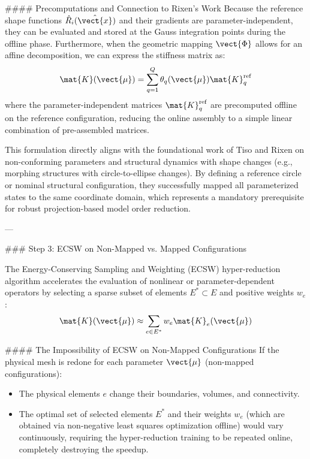 #### Precomputations and Connection to Rixen's Work
Because the reference shape functions $\hat{R}_i(\hat{\vect{x}})$ and their gradients are parameter-independent, they can be evaluated and stored at the Gauss integration points during the offline phase. Furthermore, when the geometric mapping $\vect{\Phi}$ allows for an affine decomposition, we can express the stiffness matrix as:
\begin{equation}
\mat{K}(\vect{\mu}) = \sum_{q=1}^Q \theta_q(\vect{\mu}) \mat{K}_q^{\text{ref}}
\end{equation}
where the parameter-independent matrices $\mat{K}_q^{\text{ref}}$ are precomputed offline on the reference configuration, reducing the online assembly to a simple linear combination of pre-assembled matrices.

This formulation directly aligns with the foundational work of Tiso and Rixen on non-conforming parameters and structural dynamics with shape changes (e.g., morphing structures with circle-to-ellipse changes). By defining a reference circle or nominal structural configuration, they successfully mapped all parameterized states to the same coordinate domain, which represents a mandatory prerequisite for robust projection-based model order reduction.

---

### Step 3: ECSW on Non-Mapped vs. Mapped Configurations

The Energy-Conserving Sampling and Weighting (ECSW) hyper-reduction algorithm accelerates the evaluation of nonlinear or parameter-dependent operators by selecting a sparse subset of elements $E^* \subset E$ and positive weights $w_e$:
\begin{equation}
\mat{K}(\vect{\mu}) \approx \sum_{e \in E^*} w_e \mat{K}_e(\vect{\mu})
\end{equation}

#### The Impossibility of ECSW on Non-Mapped Configurations
If the physical mesh is redone for each parameter $\vect{\mu}$ (non-mapped configurations):
\begin{itemize}
    \item The physical elements $e$ change their boundaries, volumes, and connectivity.
    \item The optimal set of selected elements $E^*$ and their weights $w_e$ (which are obtained via non-negative least squares optimization offline) would vary continuously, requiring the hyper-reduction training to be repeated online, completely destroying the speedup.
\end{itemize}

